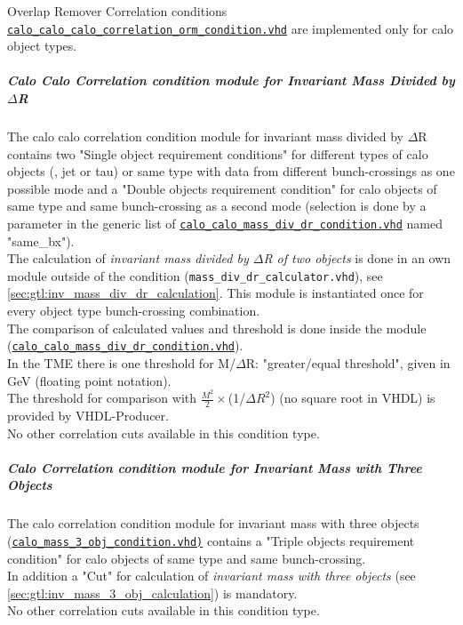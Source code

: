 Overlap Remover Correlation conditions \href{https://github.com/cms-l1-globaltrigger/mp7_ugt_legacy/tree/master/firmware/hdl/gt_mp7_core/gtl_fdl_wrapper/gtl/calo_calo_calo_correlation_orm_condition.vhd}{\texttt{calo\_calo\_calo\_correlation\_orm\_condition.vhd}} are implemented only for calo object types.

\subparagraph{Calo Calo Correlation condition module for Invariant Mass Divided by $\Delta$R}
\label{sec:gtl:calo_calo_correlation_condition_module_mass_div_dr}

The calo calo correlation condition module for invariant mass divided by $\Delta$R contains two "Single object requirement conditions" for different types of calo objects (\egamma, jet or tau) or same type with data from different bunch-crossings as one possible mode and a "Double objects requirement condition" for calo objects of same type and same bunch-crossing as a second mode (selection is done by a parameter in the generic list of \href{https://github.com/cms-l1-globaltrigger/mp7_ugt_legacy/tree/master/firmware/hdl/gt_mp7_core/gtl_fdl_wrapper/gtl/calo_calo_mass_div_dr_condition.vhd}{\texttt{calo\_calo\_mass\_div\_dr\_condition.vhd}} named "same\_bx").\\
The calculation of \textit{invariant mass divided by $\Delta$R of two objects} is done in an own module outside of the condition (\texttt{mass\_div\_dr\_calculator.vhd}), see \ref{sec:gtl:inv_mass_div_dr_calculation}. This module is instantiated once for every object type bunch-crossing combination.\\  
The comparison of calculated values and threshold is done inside the module (\href{https://github.com/cms-l1-globaltrigger/mp7_ugt_legacy/tree/master/firmware/hdl/gt_mp7_core/gtl_fdl_wrapper/gtl/calo_calo_mass_div_dr_condition.vhd}{\texttt{calo\_calo\_mass\_div\_dr\_condition.vhd}}).\\
In the TME there is one threshold for M/$\Delta$R: "greater/equal threshold", given in GeV (floating point notation).\\
The threshold for comparison with $\frac{M^2}{2}\times$(1/$\Delta$$R^2$) (no square root in VHDL) is provided by VHDL-Producer.\\
No other correlation cuts available in this condition type.

\subparagraph{Calo Correlation condition module for Invariant Mass with Three Objects}
\label{sec:gtl:calo_correlation_condition_module_mass_3_obj}

The calo correlation condition module for invariant mass with three objects (\href{https://github.com/cms-l1-globaltrigger/mp7_ugt_legacy/tree/master/firmware/hdl/gt_mp7_core/gtl_fdl_wrapper/gtl/calo_mass_3_obj_condition.vhd}{\texttt{calo\_mass\_3\_obj\_condition.vhd)}} contains a "Triple objects requirement condition" for calo objects of same type and same bunch-crossing.\\
In addition a "Cut" for calculation of \textit{invariant mass with three objects} (see \ref{sec:gtl:inv_mass_3_obj_calculation}) is mandatory.\\
No other correlation cuts available in this condition type.

